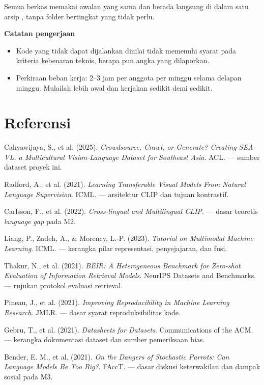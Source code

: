 \documentclass[12pt, a4paper]{article}
\begin{document}
Semua berkas memakai awalan  yang sama dan berada langsung di dalam satu arsip , tanpa folder bertingkat yang tidak perlu.

\begin{callout}[ctpBlue]
\textbf{\color{ctpBlue}Catatan pengerjaan}
\begin{itemize}
  \item Kode yang tidak dapat dijalankan dinilai tidak memenuhi syarat pada kriteria kebenaran teknis, berapa pun angka yang dilaporkan.
  \item Perkiraan beban kerja: 2--3 jam per anggota per minggu selama delapan minggu. Mulailah lebih awal dan kerjakan sedikit demi sedikit.
\end{itemize}
\end{callout}

\section*{Referensi}
{\small\color{ctpSubtext}
\begin{enumerate}[label={[\arabic*]}, leftmargin=2em]
  \item Cahyawijaya, S., et al. (2025). \emph{Crowdsource, Crawl, or Generate? Creating SEA-VL, a Multicultural Vision-Language Dataset for Southeast Asia}. ACL. --- sumber dataset proyek ini.
  \item Radford, A., et al. (2021). \emph{Learning Transferable Visual Models From Natural Language Supervision}. ICML. --- arsitektur CLIP dan tujuan kontrastif.
  \item Carlsson, F., et al. (2022). \emph{Cross-lingual and Multilingual CLIP}. --- dasar teoretis \emph{language gap} pada M2.
  \item Liang, P., Zadeh, A., \& Morency, L.-P. (2023). \emph{Tutorial on Multimodal Machine Learning}. ICML. --- kerangka pilar representasi, penyejajaran, dan fusi.
  \item Thakur, N., et al. (2021). \emph{BEIR: A Heterogeneous Benchmark for Zero-shot Evaluation of Information Retrieval Models}. NeurIPS Datasets and Benchmarks. --- rujukan protokol evaluasi retrieval.
  \item Pineau, J., et al. (2021). \emph{Improving Reproducibility in Machine Learning Research}. JMLR. --- dasar syarat reproduksibilitas kode.
  \item Gebru, T., et al. (2021). \emph{Datasheets for Datasets}. Communications of the ACM. --- kerangka dokumentasi dataset dan sumber pemeriksaan bias.
  \item Bender, E. M., et al. (2021). \emph{On the Dangers of Stochastic Parrots: Can Language Models Be Too Big?}. FAccT. --- dasar diskusi keterwakilan dan dampak sosial pada M3.
\end{enumerate}}
\end{document}
